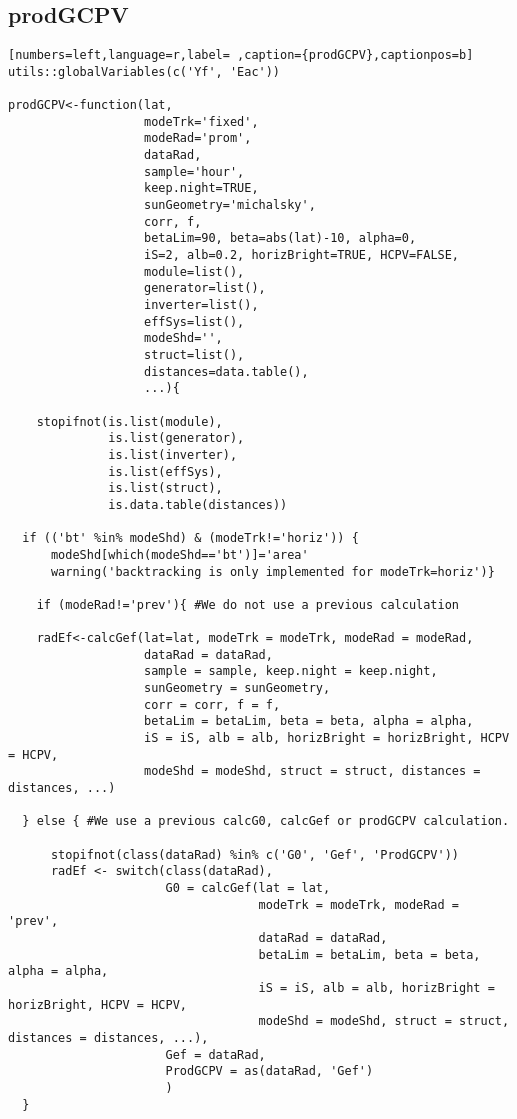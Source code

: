 \subsection{prodGCPV}
\label{sec:org70f2a82}
\label{subsec:prodgcpv}
\begin{lstlisting}[numbers=left,language=r,label= ,caption={prodGCPV},captionpos=b]
utils::globalVariables(c('Yf', 'Eac'))

prodGCPV<-function(lat,
                   modeTrk='fixed', 
                   modeRad='prom',
                   dataRad,
                   sample='hour',
                   keep.night=TRUE,
                   sunGeometry='michalsky',
                   corr, f,
                   betaLim=90, beta=abs(lat)-10, alpha=0,
                   iS=2, alb=0.2, horizBright=TRUE, HCPV=FALSE,
                   module=list(), 
                   generator=list(),
                   inverter=list(), 
                   effSys=list(), 
                   modeShd='',    
                   struct=list(), 
                   distances=data.table(),
                   ...){

    stopifnot(is.list(module),
              is.list(generator),
              is.list(inverter),
              is.list(effSys),
              is.list(struct),
              is.data.table(distances))

  if (('bt' %in% modeShd) & (modeTrk!='horiz')) {
      modeShd[which(modeShd=='bt')]='area'
      warning('backtracking is only implemented for modeTrk=horiz')}

    if (modeRad!='prev'){ #We do not use a previous calculation

    radEf<-calcGef(lat=lat, modeTrk = modeTrk, modeRad = modeRad,
                   dataRad = dataRad,
                   sample = sample, keep.night = keep.night,
                   sunGeometry = sunGeometry,
                   corr = corr, f = f,
                   betaLim = betaLim, beta = beta, alpha = alpha,
                   iS = iS, alb = alb, horizBright = horizBright, HCPV = HCPV,
                   modeShd = modeShd, struct = struct, distances = distances, ...)

  } else { #We use a previous calcG0, calcGef or prodGCPV calculation.

      stopifnot(class(dataRad) %in% c('G0', 'Gef', 'ProdGCPV'))
      radEf <- switch(class(dataRad),
                      G0 = calcGef(lat = lat,
                                   modeTrk = modeTrk, modeRad = 'prev',
                                   dataRad = dataRad,
                                   betaLim = betaLim, beta = beta, alpha = alpha,
                                   iS = iS, alb = alb, horizBright = horizBright, HCPV = HCPV,
                                   modeShd = modeShd, struct = struct, distances = distances, ...),
                      Gef = dataRad,
                      ProdGCPV = as(dataRad, 'Gef')
                      )
  }



\end{lstlisting}
